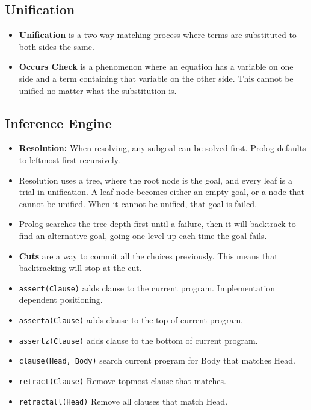 \documentclass[landscape, letterpaper]{extarticle}
\theoremstyle{definition}
\begin{document}
\begin{multicols}{3}
    \subsection*{Unification}
    \begin{itemize}[noitemsep,nolistsep]
        \item \textbf{Unification} is a two way matching process where terms are substituted to both sides the same.
        \item \textbf{Occurs Check} is a phenomenon where an equation has a variable on one side and a term containing that variable on the other side. This cannot be unified no matter what the substitution is.
    \end{itemize}
    \subsection*{Inference Engine}
    \begin{itemize}[noitemsep,nolistsep]
        \item \textbf{Resolution:} When resolving, any subgoal can be solved first. Prolog defaults to leftmost first recursively. 
        \item Resolution uses a tree, where the root node is the goal, and every leaf is a trial in unification. A leaf node becomes either an empty goal, or a node that cannot be unified. When it cannot be unified, that goal is failed.
        \item Prolog searches the tree depth first until a failure, then it will backtrack to find an alternative goal, going one level up each time the goal fails.
        \item \textbf{Cuts} are a way to commit all the choices previously. This means that backtracking will stop at the cut.
        \item \verb|assert(Clause)| adds clause to the current program. Implementation dependent positioning.
        \item \verb|asserta(Clause)| adds clause to the top of current program.
        \item \verb|assertz(Clause)| adds clause to the bottom of current program.
        \item \verb|clause(Head, Body)| search current program for Body that matches Head.
        \item \verb|retract(Clause)| Remove topmost clause that matches.
       \item \verb|retractall(Head)| Remove all clauses that match Head.
    \end{itemize}

\end{multicols}
\end{document}
